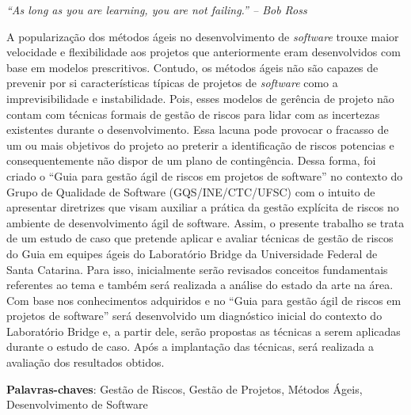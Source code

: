 \documentclass[
    12pt,       %
    openright,      %
    twoside,      %
    a4paper,      %
    english,      %
    french,       %
    spanish,      %
    brazil,       %
    ]{abntex2}
\begin{document}
  \begin{agradecimentos}
  \end{agradecimentos}

  \begin{epigrafe}
      \vspace*{\fill}
    \begin{flushright}
      \textit{“As long as you are learning, you are not failing.” – Bob Ross}
    \end{flushright}
  \end{epigrafe}


  \begin{resumo}
    A popularização dos métodos ágeis no desenvolvimento de \textit{software} trouxe maior velocidade e flexibilidade aos projetos que anteriormente eram desenvolvidos com base em modelos prescritivos. Contudo, os métodos ágeis não são capazes de prevenir por si características típicas de projetos de \textit{software} como a imprevisibilidade e instabilidade. Pois, esses modelos de gerência de projeto não contam com técnicas formais de gestão de riscos para lidar com as incertezas existentes durante o desenvolvimento. Essa lacuna pode provocar o fracasso de um ou mais objetivos do projeto ao preterir a identificação de riscos potencias e consequentemente não dispor de um plano de contingência. Dessa forma, foi criado o “Guia para gestão ágil de riscos em projetos de software” no contexto do Grupo de Qualidade de Software (GQS/INE/CTC/UFSC) com o intuito de apresentar diretrizes que visam auxiliar a prática da gestão explícita de riscos no ambiente de desenvolvimento ágil de software. Assim, o presente trabalho se trata de um estudo de caso que pretende aplicar e avaliar técnicas de gestão de riscos do Guia em equipes ágeis do Laboratório Bridge da Universidade Federal de Santa Catarina. Para isso, inicialmente serão revisados conceitos fundamentais referentes ao tema e também será realizada a análise do estado da arte na área. Com base nos conhecimentos adquiridos e no “Guia para gestão ágil de riscos em projetos de software” será desenvolvido um diagnóstico inicial do contexto do Laboratório Bridge e, a partir dele, serão propostas as técnicas a serem aplicadas durante o estudo de caso. Após a implantação das técnicas, será realizada a avaliação dos resultados obtidos.
   \vspace{\onelineskip}

   \noindent
   \textbf{Palavras-chaves}: Gestão de Riscos, Gestão de Projetos, Métodos Ágeis, Desenvolvimento de Software
  \end{resumo}
\end{document}
